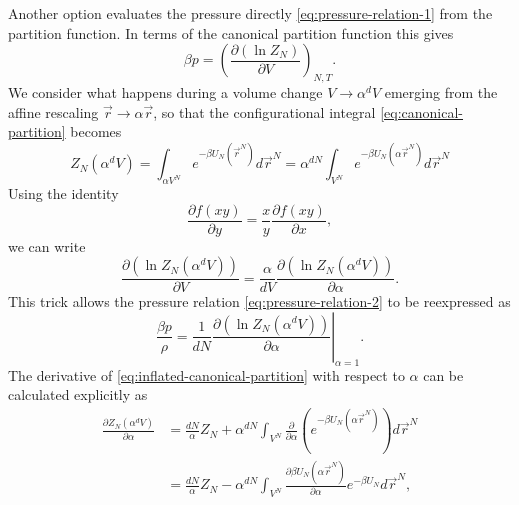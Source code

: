 Another option evaluates the pressure directly \eqref{eq:pressure-relation-1} from the partition function.
In terms of the canonical partition function this gives
\begin{equation}\label{eq:pressure-relation-2}
  \beta p
  =
  \left( \frac{\partial (\ln{Z_N})}{\partial V} \right)_{N,T}.
\end{equation}
We consider what happens during a volume change $V \to \alpha^d V$ emerging from the affine rescaling $\vec{r} \to \alpha \vec{r}$, so that the configurational integral \eqref{eq:canonical-partition} becomes
\begin{equation}\label{eq:inflated-canonical-partition}
  Z_N(\alpha^d V)
  =
  \int_{\alpha V^N} e^{-\beta U_N(\vec{r}^N)} d\vec{r}^N
  =
  \alpha^{dN}
  \int_{V^N} e^{-\beta U_N(\alpha \vec{r}^N)} d\vec{r}^N
\end{equation}
Using the identity
\begin{equation*}
  \frac{\partial f(xy)}{\partial y}
  =
  \frac{x}{y} \frac{\partial f(xy)}{\partial x},
\end{equation*}
we can write
\begin{equation}
  \frac{\partial (\ln{Z_N(\alpha^d V)})}{\partial V}
  =
  \frac{\alpha}{d V}
  \frac{\partial (\ln{Z_N(\alpha^d V)})}{\partial \alpha}.
\end{equation}
This trick allows the pressure relation \eqref{eq:pressure-relation-2} to be reexpressed as
\begin{equation*}
  \frac{\beta p}{\rho}
  =
  \frac{1}{d N}
  \left.
  \frac{\partial (\ln{Z_N(\alpha^d V)})}{\partial \alpha}
  \right|_{\alpha = 1}.
\end{equation*}
The derivative of \eqref{eq:inflated-canonical-partition} with respect to $\alpha$ can be calculated explicitly as
\begin{equation*}
  \begin{split}
    \frac{\partial Z_N(\alpha^d V)}{\partial \alpha}
    &=
    \frac{dN}{\alpha} Z_N
    +
    \alpha^{dN}
    \int_{V^N}
    \frac{\partial}{\partial \alpha}
    \left( e^{-\beta U_N(\alpha \vec{r}^N)} \right)
    d\vec{r}^N
    \\ &=
    \frac{dN}{\alpha} Z_N
    -
    \alpha^{dN}
    \int_{V^N}
    \frac{\partial \beta U_N(\alpha \vec{r}^N)}{\partial \alpha}
    e^{-\beta U_N}
    d\vec{r}^N,
  \end{split}
\end{equation*}
